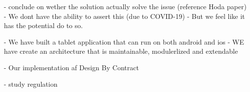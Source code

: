 - conclude on wether the solution actually solve the issue (reference Hoda paper)
    - We dont have the ability to assert this (due to COVID-19)
    - But we feel like it has the potential do to so.

- We have built a tablet application that can run on both android and ios
    - WE have create an architecture that is maintainable, modulerlized and extendable

- Our implementation af Design By Contract

- study regulation